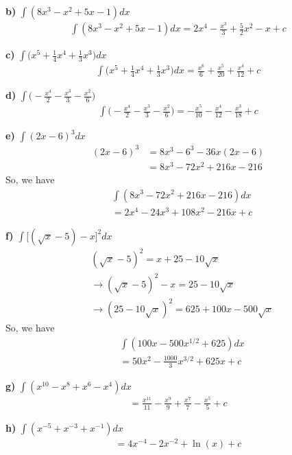\documentclass{article}
\begin{document}
\begin{multicols}{2}
\textbf{b)} $\int (8x^3 - x^2 + 5x - 1)dx$
\begin{align*}
    \int (8x^3 - x^2 + 5x - 1)dx = 2x^4 - \frac{x^3}{3} + \frac{5}{2}x^2 - x + c
\end{align*}


\textbf{c)} $\int \Big(x^5 + \frac{1}{4}x^4 + \frac{1}{3}x^3 \Big)dx$
\begin{align*}
    \int \Big(x^5 + \frac{1}{4}x^4 + \frac{1}{3}x^3 \Big)dx = \frac{x^6}{6} + \frac{x^5}{20} + \frac{x^4}{12} + c
\end{align*}


\textbf{d)} $\int \Big(-\frac{x^4}{2} - \frac{x^3}{3} - \frac{x^2}{6} \Big)$
\begin{align*}
    \int \Big(-\frac{x^4}{2} - \frac{x^3}{3} - \frac{x^2}{6} \Big) = -\frac{x^5}{10} - \frac{x^4}{12} - \frac{x^3}{18} + c
\end{align*}


\textbf{e)} $\int (2x - 6)^3dx$
\begin{align*}
    (2x - 6)^3 &= 8x^3 - 6^3 - 36x(2x - 6) \\
                &= 8x^3 - 72x^2 + 216x - 216
\end{align*}
So, we have
\begin{align*}
    &\int (8x^3 - 72x^2 + 216x - 216)dx \\
    &= 2x^4 - 24x^3 + 108x^2 - 216x + c
\end{align*}


\textbf{f)} $\int \Big[(\sqrt{x} - 5) - x \Big]^2dx$
\begin{align*}
    &(\sqrt{x} - 5)^2 = x + 25 - 10\sqrt{x} \\
    &\rightarrow (\sqrt{x} - 5)^2 - x = 25 - 10\sqrt{x} \\
    &\rightarrow (25 - 10\sqrt{x})^2 = 625 + 100x - 500\sqrt{x}
\end{align*}
So, we have
\begin{align*}
    &\int (100x - 500x^{1/2} + 625)dx \\
    &=50x^2 - \frac{1000}{3}x^{3/2} + 625x + c
\end{align*}


\textbf{g)} $\int (x^{10} - x^8 + x^6 - x^4)dx$
\begin{align*}
    = \frac{x^{11}}{11} - \frac{x^9}{9} + \frac{x^7}{7} - \frac{x^5}{5} + c
\end{align*}


\textbf{h)} $\int (x^{-5} + x^{-3} + x^{-1})dx$
\begin{align*}
    = 4x^{-4} - 2x^{-2} + \ln(x) + c
\end{align*}



\end{multicols}
\end{document}
